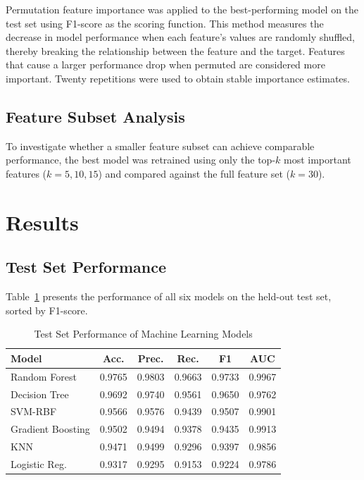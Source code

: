 \documentclass[conference]{IEEEtran}
\begin{document}
Permutation feature importance was applied to the best-performing model on the test set using F1-score as the scoring function. This method measures the decrease in model performance when each feature's values are randomly shuffled, thereby breaking the relationship between the feature and the target. Features that cause a larger performance drop when permuted are considered more important. Twenty repetitions were used to obtain stable importance estimates.

\subsection{Feature Subset Analysis}

To investigate whether a smaller feature subset can achieve comparable performance, the best model was retrained using only the top-$k$ most important features ($k = 5, 10, 15$) and compared against the full feature set ($k = 30$).

\section{Results}

\subsection{Test Set Performance}

Table~\ref{tab:test_results} presents the performance of all six models on the held-out test set, sorted by F1-score.

\begin{table}[htbp]
\caption{Test Set Performance of Machine Learning Models}
\label{tab:test_results}
\centering
\begin{tabular}{lccccc}
\toprule
\textbf{Model} & \textbf{Acc.} & \textbf{Prec.} & \textbf{Rec.} & \textbf{F1} & \textbf{AUC} \\
\midrule
Random Forest & 0.9765 & 0.9803 & 0.9663 & 0.9733 & 0.9967 \\
Decision Tree & 0.9692 & 0.9740 & 0.9561 & 0.9650 & 0.9762 \\
SVM-RBF & 0.9566 & 0.9576 & 0.9439 & 0.9507 & 0.9901 \\
Gradient Boosting & 0.9502 & 0.9494 & 0.9378 & 0.9435 & 0.9913 \\
KNN & 0.9471 & 0.9499 & 0.9296 & 0.9397 & 0.9856 \\
Logistic Reg. & 0.9317 & 0.9295 & 0.9153 & 0.9224 & 0.9786 \\
\bottomrule
\end{tabular}
\end{table}
\end{document}
